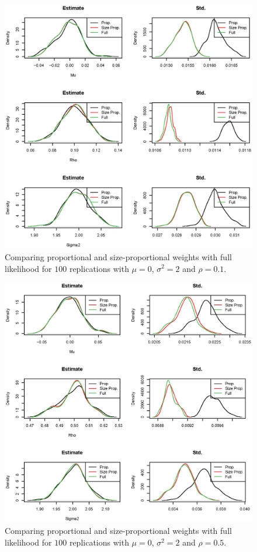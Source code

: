 \documentclass[11pt,a5paper,twoside]{book}
\begin{document}
{\begin{figure}[ht!]
\centering
\includegraphics[width=\textwidth]{rho1.eps}
\caption{Comparing proportional and size-proportional weights with full likelihood for $100$ replications with $\mu=0$, $\sigma^2=2$ and $\rho=0.1$.} \label{fig_rho1}
\end{figure}

\begin{figure}[ht!]
\centering
\includegraphics[width=\textwidth]{rho2.eps}
\caption{Comparing proportional and size-proportional weights with full likelihood for $100$ replications with $\mu=0$, $\sigma^2=2$ and $\rho=0.5$.} \label{fig_rho2}
\end{figure}

}
\end{document}
